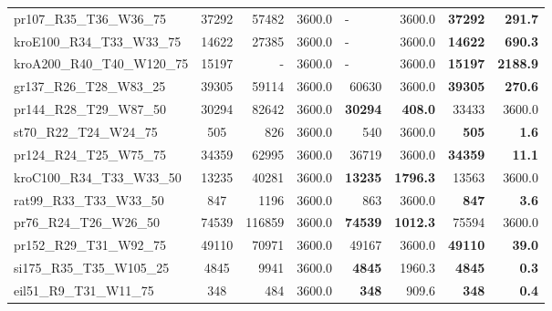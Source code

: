 \documentclass{singlecol-new}
\theoremstyle{TH}{
\newtheorem{lemma}{Lemma}
\newtheorem{theorem}[lemma]{Theorem}
\newtheorem{corrolary}[lemma]{Corrolary}
\newtheorem{conjecture}[lemma]{Conjecture}
\newtheorem{proposition}[lemma]{Proposition}
\newtheorem{claim}[lemma]{Claim}
\newtheorem{stheorem}[lemma]{Wrong Theorem}
}
\theoremstyle{THrm}{
\newtheorem{definition}{Definition}[section]
\newtheorem{question}{Question}[section]
\newtheorem{remark}{Remark}
\newtheorem{scheme}{Scheme}
}
\theoremstyle{THhit}{
\newtheorem{case}{Case}[section]
}
\begin{document}
\begin{table}
{\begin{tabular}{lcrrrrrr}
		pr107\_R35\_T36\_W36\_75    & 37292                & 57482           & 3600.0 & \multicolumn{1}{l}{-} & 3600.0          & \textbf{37292} & \textbf{291.7}  \\
		kroE100\_R34\_T33\_W33\_75  & 14622                & 27385           & 3600.0 & \multicolumn{1}{l}{-} & 3600.0          & \textbf{14622} & \textbf{690.3}  \\
		kroA200\_R40\_T40\_W120\_75 & 15197                & -               & 3600.0 & \multicolumn{1}{l}{-} & 3600.0          & \textbf{15197} & \textbf{2188.9} \\
		gr137\_R26\_T28\_W83\_25    & 39305                & 59114           & 3600.0 & 60630                 & 3600.0          & \textbf{39305} & \textbf{270.6}  \\
		pr144\_R28\_T29\_W87\_50    & 30294                & 82642           & 3600.0 & \textbf{30294}        & \textbf{408.0}  & 33433          & 3600.0          \\
		st70\_R22\_T24\_W24\_75     & 505                  & 826             & 3600.0 & 540                   & 3600.0          & \textbf{505}   & \textbf{1.6}    \\
		pr124\_R24\_T25\_W75\_75    & 34359                & 62995           & 3600.0 & 36719                 & 3600.0          & \textbf{34359} & \textbf{11.1}   \\
		kroC100\_R34\_T33\_W33\_50  & 13235                & 40281           & 3600.0 & \textbf{13235}        & \textbf{1796.3} & 13563          & 3600.0          \\
		rat99\_R33\_T33\_W33\_50    & 847                  & 1196            & 3600.0 & 863                   & 3600.0          & \textbf{847}   & \textbf{3.6}    \\
		pr76\_R24\_T26\_W26\_50     & 74539                & 116859          & 3600.0 & \textbf{74539}        & \textbf{1012.3} & 75594          & 3600.0          \\
		pr152\_R29\_T31\_W92\_75    & 49110                & 70971           & 3600.0 & 49167                 & 3600.0          & \textbf{49110} & \textbf{39.0}   \\
		si175\_R35\_T35\_W105\_25   & 4845                 & 9941            & 3600.0 & \textbf{4845}         & 1960.3          & \textbf{4845}  & \textbf{0.3}    \\
		eil51\_R9\_T31\_W11\_75     & 348                  & 484             & 3600.0 & \textbf{348}          & 909.6           & \textbf{348}   & \textbf{0.4}    \\

\end{tabular}}
\end{table}
\end{document}
